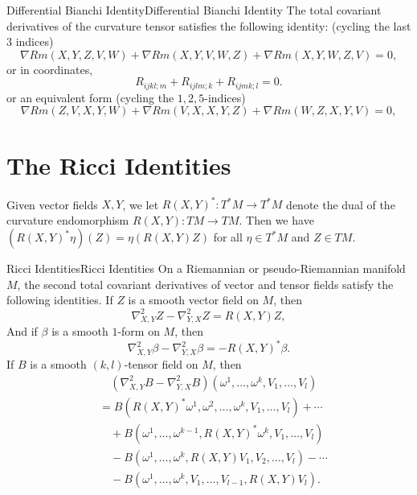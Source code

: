 \documentclass[../main.tex]{subfiles}
\begin{document}
\begin{proposition}{Differential Bianchi Identity}{Differential Bianchi Identity}
	The total covariant derivatives of the curvature tensor satisfies the following identity: (cycling the last $3$ indices)
	\begin{equation}
		\nabla Rm(X, Y, Z, V, W) + \nabla Rm(X, Y, V, W, Z) + \nabla Rm(X, Y, W, Z, V) = 0,
	\end{equation}
	or in coordinates,
	\begin{equation}
		R_{ijkl;m} + R_{ijlm;k} + R_{ijmk;l} = 0.
	\end{equation}
	or an equivalent form (cycling the $1,2,5$-indices)
	\begin{equation}
		\nabla Rm(Z, V, X, Y, W) + \nabla Rm(V, X, X, Y, Z) + \nabla Rm(W, Z, X, Y, V) = 0,
	\end{equation}
\end{proposition}

\section{The Ricci Identities}
Given vector fields $X, Y$, we let $R(X, Y)^*: T^* M \to T^* M$ denote the dual of the curvature endomorphism $R(X, Y): TM \to TM$. Then we have $(R(X, Y)^* \eta)(Z) = \eta(R(X, Y)Z)$ for all $\eta \in T^* M$ and $Z \in TM$.

\begin{theorem}{Ricci Identities}{Ricci Identities}
	On a Riemannian or pseudo-Riemannian manifold $M$, the second total covariant derivatives of vector and tensor fields satisfy the following identities. If $Z$ is a smooth vector field on $M$, then
	\begin{equation}
		\nabla_{X, Y}^2 Z - \nabla_{Y, X}^2 Z = R(X, Y)Z,
	\end{equation}
	And if $\beta$ is a smooth $1$-form on $M$, then
	\begin{equation}
		\nabla_{X, Y}^2 \beta - \nabla_{Y, X}^2 \beta = - R(X, Y)^* \beta.
	\end{equation}
	If $B$ is a smooth $(k, l)$-tensor field on $M$, then
	\begin{equation}
		\begin{aligned}
			&\quad (\nabla_{X, Y}^2 B - \nabla_{Y, X}^2 B)(\omega^1, \ldots, \omega^k, V_1, \ldots, V_l) \\
			&= B(R(X, Y)^* \omega^1, \omega^2, \ldots, \omega^k, V_1, \ldots, V_l) + \cdots \\
			&\quad + B(\omega^1, \ldots, \omega^{k-1}, R(X, Y)^* \omega^k, V_1, \ldots, V_l) \\
			&\quad - B(\omega^1, \ldots, \omega^k, R(X, Y)V_1, V_2, \ldots, V_l) - \cdots \\
			&\quad - B(\omega^1, \ldots, \omega^k, V_1, \ldots, V_{l-1}, R(X, Y)V_l).
		\end{aligned}
	\end{equation}
\end{theorem}
\end{document}
